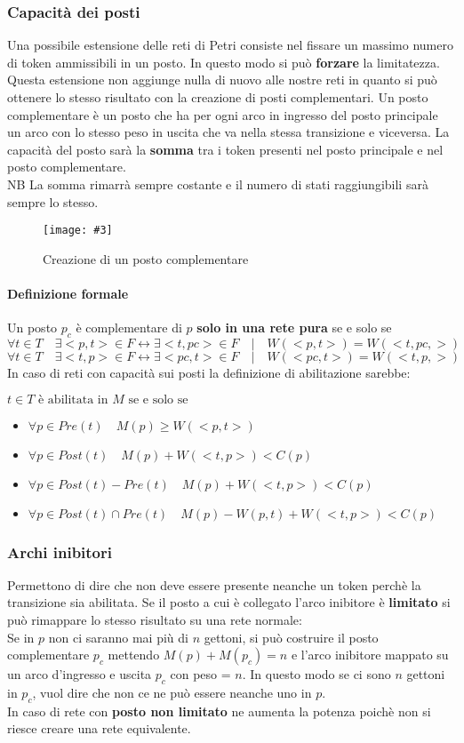 \documentclass[12pt, twoside, letterpaper]{article}
\newcommand{\img}[3] {
	\begin{figure}[h]
		\caption{#1}
		\centering
		\texttt{[image: \#3]}\\
	\end{figure}
}
\begin{document}
			\subsubsection{Capacità dei posti}
				Una possibile estensione delle reti di Petri consiste nel fissare un massimo numero di token ammissibili in un posto. In questo modo si può \textbf{forzare} la limitatezza.
				Questa estensione non aggiunge nulla di nuovo alle nostre reti in quanto si può ottenere lo stesso risultato con la creazione di posti complementari. Un posto complementare è un posto che ha per ogni arco in ingresso del posto principale un arco con lo stesso peso in uscita che va nella stessa transizione e viceversa. La capacità del posto sarà la \textbf{somma} tra i token presenti nel posto principale e nel posto complementare.\\
				\textsf{NB} La somma rimarrà sempre costante e il numero di stati raggiungibili sarà sempre lo stesso.
				\img{Creazione di un posto complementare}{0.4}{img/capacita.png}
				\paragraph{Definizione formale} Un posto $p_c$ è complementare di $p$ \textbf{solo in una rete pura} se e solo se 
				$$\forall t \in T \quad \exists <p,t> \in F \leftrightarrow \exists <t,pc> \in F \quad|\quad W(<p,t>) = W(<t,pc,>)$$
				$$\forall t \in T \quad \exists <t,p> \in F \leftrightarrow \exists <pc,t> \in F \quad|\quad W(<pc,t>) = W(<t,p,>)$$
				In caso di reti con capacità sui posti la definizione di abilitazione sarebbe: 
				
				$t \in T \text{ è abilitata in $M$ se e solo se}$
				\begin{itemize}
					\item $\forall p \in Pre(t) \quad M(p) \geq W(<p,t>)$ 
					\item $\forall p \in Post(t) \quad M(p) + W(<t,p>) < C(p)$
					\item $\forall p \in Post(t) - Pre(t) \quad M(p) + W(<t,p>) < C(p)$
					\item $\forall p \in Post(t) \cap Pre(t) \quad M(p) - W(p,t) + W(<t,p>) < C(p)$
				\end{itemize}
				
			\subsubsection{Archi inibitori}
				Permettono di dire che non deve essere presente neanche un token perchè la transizione sia abilitata. Se il posto a cui è collegato l'arco inibitore è \textbf{limitato} si può rimappare lo stesso risultato su una rete normale: \\
				Se in $p$ non ci saranno mai più di $n$ gettoni, si può costruire il posto complementare $p_c$ mettendo $M(p) + M(p_c) = n$ e l'arco inibitore mappato su un arco d'ingresso e uscita $p_c$ con peso = $n$. In questo modo se ci sono $n$ gettoni in $p_c$, vuol dire che non ce ne può essere neanche uno in $p$. \\
				 In caso di rete con \textbf{posto non limitato} ne aumenta la potenza poichè non si riesce creare una rete equivalente.
\end{document}
